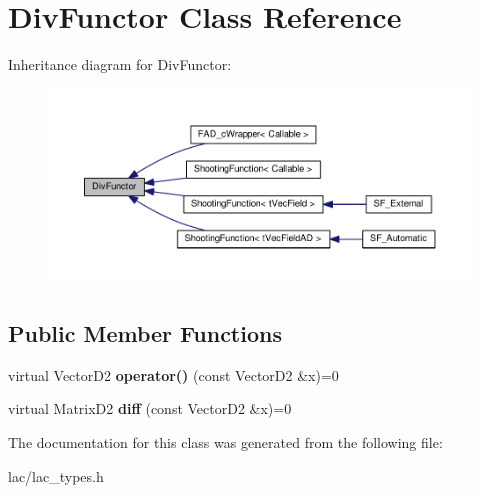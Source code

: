 \hypertarget{classDivFunctor}{}\section{Div\+Functor Class Reference}
\label{classDivFunctor}


Inheritance diagram for Div\+Functor\+:
\nopagebreak
\begin{figure}[H]
\begin{center}
\leavevmode
\includegraphics[width=350pt]{classDivFunctor__inherit__graph}
\end{center}
\end{figure}
\subsection*{Public Member Functions}
\begin{DoxyCompactItemize}
\item 
\mbox{\label{classDivFunctor_a0c4d9fb9cafe957d07f3f1ab1492eeb7}} 
virtual Vector\+D2 {\bfseries operator()} (const Vector\+D2 \&x)=0
\item 
\mbox{\label{classDivFunctor_aef605410aadd00d345287a539bc81c08}} 
virtual Matrix\+D2 {\bfseries diff} (const Vector\+D2 \&x)=0
\end{DoxyCompactItemize}


The documentation for this class was generated from the following file\+:\begin{DoxyCompactItemize}
\item 
lac/lac\+\_\+types.\+h\end{DoxyCompactItemize}
